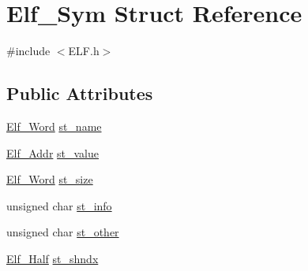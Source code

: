 \hypertarget{struct_elf___sym}{\section{Elf\+\_\+\+Sym Struct Reference}
\label{struct_elf___sym}
}


{\ttfamily \#include $<$E\+L\+F.\+h$>$}

\subsection*{Public Attributes}
\begin{DoxyCompactItemize}
\item 
\hyperlink{_e_l_f_8h_a497c5f6b52d8b0a104779c9e0c2da019}{Elf\+\_\+\+Word} \hyperlink{struct_elf___sym_a13b6ad0f2418ed6fa4470503854325b7}{st\+\_\+name}
\item 
\hyperlink{_e_l_f_8h_a83694be97fb890d1883ac3c680ca523d}{Elf\+\_\+\+Addr} \hyperlink{struct_elf___sym_ac015122a113328a5ebe6a8336143814e}{st\+\_\+value}
\item 
\hyperlink{_e_l_f_8h_a497c5f6b52d8b0a104779c9e0c2da019}{Elf\+\_\+\+Word} \hyperlink{struct_elf___sym_ab5ec712b8c3619c7f3b88f750580dc5f}{st\+\_\+size}
\item 
unsigned char \hyperlink{struct_elf___sym_acbc297896a6b0c4e54d2509755c1c694}{st\+\_\+info}
\item 
unsigned char \hyperlink{struct_elf___sym_a418e07c9488c0f57d1e41a3af5f8b4bc}{st\+\_\+other}
\item 
\hyperlink{_e_l_f_8h_aaf9fe3321fba0710dcfd99e46b3e0fa8}{Elf\+\_\+\+Half} \hyperlink{struct_elf___sym_a7c7c6fa8df5a0e17f3425fb82437a239}{st\+\_\+shndx}
\end{DoxyCompactItemize}


